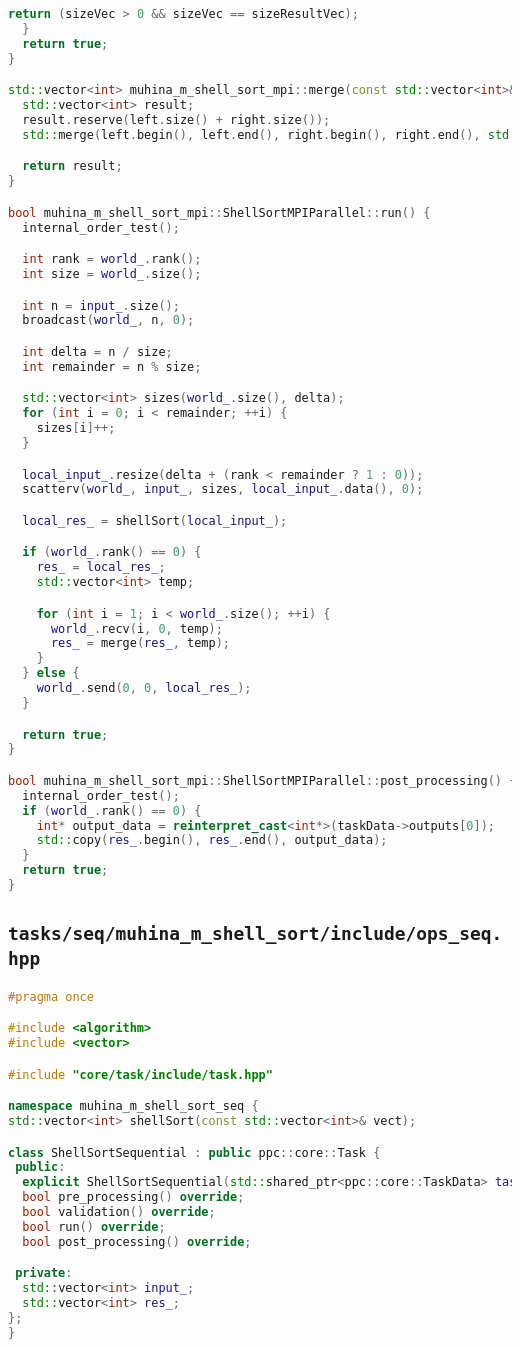 \documentclass[12pt]{article}
\begin{document}
\begin{lstlisting}[language=C++]
    return (sizeVec > 0 && sizeVec == sizeResultVec);
  }
  return true;
}

std::vector<int> muhina_m_shell_sort_mpi::merge(const std::vector<int>& left, const std::vector<int>& right) {
  std::vector<int> result;
  result.reserve(left.size() + right.size());
  std::merge(left.begin(), left.end(), right.begin(), right.end(), std::back_inserter(result));

  return result;
}

bool muhina_m_shell_sort_mpi::ShellSortMPIParallel::run() {
  internal_order_test();

  int rank = world_.rank();
  int size = world_.size();

  int n = input_.size();
  broadcast(world_, n, 0);

  int delta = n / size;
  int remainder = n % size;

  std::vector<int> sizes(world_.size(), delta);
  for (int i = 0; i < remainder; ++i) {
    sizes[i]++;
  }

  local_input_.resize(delta + (rank < remainder ? 1 : 0));
  scatterv(world_, input_, sizes, local_input_.data(), 0);

  local_res_ = shellSort(local_input_);

  if (world_.rank() == 0) {
    res_ = local_res_;
    std::vector<int> temp;

    for (int i = 1; i < world_.size(); ++i) {
      world_.recv(i, 0, temp);
      res_ = merge(res_, temp);
    }
  } else {
    world_.send(0, 0, local_res_);
  }

  return true;
}

bool muhina_m_shell_sort_mpi::ShellSortMPIParallel::post_processing() {
  internal_order_test();
  if (world_.rank() == 0) {
    int* output_data = reinterpret_cast<int*>(taskData->outputs[0]);
    std::copy(res_.begin(), res_.end(), output_data);
  }
  return true;
}
\end{lstlisting}
\subsection*{\texttt{tasks/seq/muhina\_m\_shell\_sort/include/ops\_seq.hpp}}

\begin{lstlisting}[language=C++]
#pragma once

#include <algorithm>
#include <vector>

#include "core/task/include/task.hpp"

namespace muhina_m_shell_sort_seq {
std::vector<int> shellSort(const std::vector<int>& vect);

class ShellSortSequential : public ppc::core::Task {
 public:
  explicit ShellSortSequential(std::shared_ptr<ppc::core::TaskData> taskData_) : Task(std::move(taskData_)) {}
  bool pre_processing() override;
  bool validation() override;
  bool run() override;
  bool post_processing() override;

 private:
  std::vector<int> input_;
  std::vector<int> res_;
};
} 
\end{lstlisting}
\end{document}
